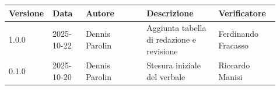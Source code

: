 \documentclass[a4paper,12pt]{article}
\begin{document}
\begin{center}
\small
\renewcommand{\arraystretch}{1.2} 
\begin{tabular}{|p{0.1\linewidth}|p{0.12\linewidth}|p{0.22\linewidth}|p{0.26\linewidth}|p{0.22\linewidth}|}
\hline
\rowcolor{gray!60} 
\textbf{Versione} & \textbf{Data} & \textbf{Autore} & \textbf{Descrizione} & \textbf{Verificatore} \\
\hline
\rowcolor{white}
1.0.0 & 2025-10-22 & Dennis Parolin & Aggiunta tabella di redazione e revisione & Ferdinando Fracasso \\
\hline
\rowcolor{gray!20}
0.1.0 & 2025-10-20 & Dennis Parolin & Stesura iniziale del verbale & Riccardo Manisi \\
\hline
\end{tabular}
\end{center}
\end{document}
